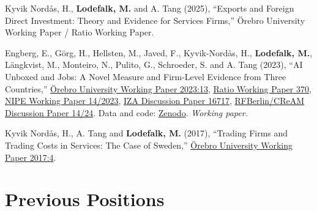 \documentclass[11pt,a4paper]{article}
\newcommand{\name}[1]{\textbf{#1}}
\newcommand{\publication}[1]{\item #1}
\begin{document}
\begin{enumerate}[label={[\arabic*]}]
\publication{Kyvik Nordås, H., \name{Lodefalk, M.} and A. Tang (2025), ``Exports and Foreign Direct Investment: Theory and Evidence for Services Firms,'' Örebro University Working Paper / Ratio Working Paper.}

\publication{Engberg, E., Görg, H., Hellsten, M., Javed, F., Kyvik-Nordås, H., \name{Lodefalk, M.}, Längkvist, M., Monteiro, N., Pulito, G., Schroeder, S. and A. Tang (2023), ``AI Unboxed and Jobs: A Novel Measure and Firm-Level Evidence from Three Countries,'' \href{https://www.oru.se/globalassets/oru-sv/institutioner/hh/workingpapers/workingpapers2023/wp-13-2023.pdf}{Örebro University Working Paper 2023:13}, \href{https://cms.ratio.se/app/uploads/2023/12/wp-370-ai-unboxed.pdf}{Ratio Working Paper 370}, \href{https://repositorium.sdum.uminho.pt/handle/1822/92783}{NIPE Working Paper 14/2023}, \href{https://www.iza.org/publications/dp/16717}{IZA Discussion Paper 16717}, \href{https://www.rfberlin.com/wp-content/uploads/2024/08/AI-Unboxed-and-Jobs-A-Novel-Measure-and-Firm-Level-Evidence-from-Three-Countries.pdf}{RFBerlin/CReAM Discussion Paper 14/24}. Data and code: \href{https://doi.org/10.5281/zenodo.21873968}{Zenodo}. \textit{Working paper.}} %

\publication{Kyvik Nordås, H., A. Tang and \name{Lodefalk, M.} (2017), ``Trading Firms and Trading Costs in Services: The Case of Sweden,'' \href{https://www.oru.se/globalassets/oru-sv/institutioner/hh/workingpapers/workingpapers2017/wp-4-2017.pdf}{Örebro University Working Paper 2017:4}.}

\end{enumerate}

\section{Previous Positions}
\end{document}
